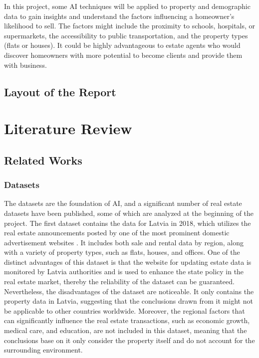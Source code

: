 \documentclass[12pt,twoside]{report}
\begin{document}
In this project, some AI techniques will be applied to property and demographic data to gain insights and understand the factors influencing a homeowner's likelihood to sell. The factors might include the proximity to schools, hospitals, or supermarkets, the accessibility to public transportation, and the property types (flats or houses). It could be highly advantageous to estate agents who would discover homeowners with more potential to become clients and provide them with business. 

\section{Layout of the Report}

\chapter{Literature Review}
\section{Related Works}
\subsection{Datasets}
The datasets are the foundation of AI, and a significant number of real estate datasets have been published, some of which are analyzed at the beginning of the project. The first dataset contains the data for Latvia in 2018, which utilizes the real estate announcements posted by one of the most prominent domestic advertisement websites \citep{RN22}. It includes both sale and rental data by region, along with a variety of property types, such as flats, houses, and offices. One of the distinct advantages of this dataset is that the website for updating estate data is monitored by Latvia authorities and is used to enhance the state policy in the real estate market, thereby the reliability of the dataset can be guaranteed.
\\

Nevertheless, the disadvantages of the dataset are noticeable. It only contains the property data in Latvia, suggesting that the conclusions drawn from it might not be applicable to other countries worldwide. Moreover, the regional factors that can significantly influence the real estate transactions, such as economic growth, medical care, and education, are not included in this dataset, meaning that the conclusions base on it only consider the property itself and do not account for the surrounding environment. 
\\
\end{document}
